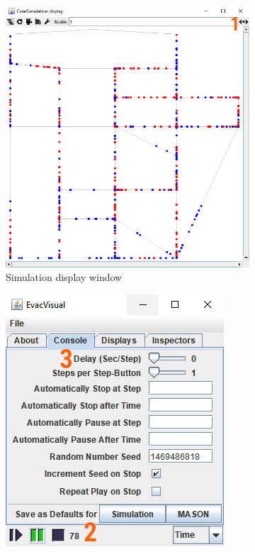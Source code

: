 \begin{figure}
    \centering
    \begin{subfigure}[b]{0.5\textwidth}
        \centering
         \includegraphics[width=\textwidth]{images/display_edit.png}
         \caption{Simulation display window}
         \label{fig:gui_display}
    \end{subfigure}
    \hspace{1cm}
    \begin{subfigure}[b]{0.3\textwidth}
        \centering
         \includegraphics[width=\textwidth]{images/console_edit.png}

\end{subfigure}
\end{figure}
